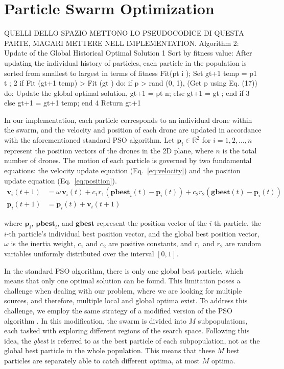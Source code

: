 \section{Particle Swarm Optimization}
QUELLI DELLO SPAZIO METTONO LO PSEUDOCODICE DI QUESTA PARTE,
MAGARI METTERE NELL IMPLEMENTATION.
Algorithm 2: Update of the Global Historical Optimal
Solution
1 Sort by fitness value: After updating the individual history of
particles, each particle in the population is sorted from smallest to
largest in terms of fitness Fit(pt
i
);
Set gt+1
temp = p1
t
;
2 if Fit (gt+1
temp) > Fit (gt
) do:
if p > rand (0, 1), (Get p using Eq. (17)) do:
Update the global optimal solution, gt+1 = pt
n;
else gt+1 = gt
;
end if
3 else gt+1 = gt+1
temp;
end
4 Return gt+1


\par In our implementation, each particle corresponds to an individual drone 
within the swarm, and the velocity and position of each drone are updated in 
accordance with the aforementioned standard PSO algorithm. Let $\mathbf{p}_i \in \mathbb{R}^2$ 
for $i = 1, 2, \dots, n$ represent the position vectors of the drones in the 2D plane, 
where $n$ is the total number of drones. The motion of each particle is governed 
by two fundamental equations: the velocity update equation (Eq.~\ref{eq:velocity}) and 
the position update equation (Eq.~\ref{eq:position}).
\begin{align}
    \mathbf{v}_{i}(t+1) &= \omega \, \mathbf{v}_{i}(t) + c_1 r_1 \left( \mathbf{pbest}_{i}(t) - \mathbf{p}_{i}(t) \right) 
    + c_2 r_2 \left( \mathbf{gbest}(t) - \mathbf{p}_{i}(t) \right) \label{eq:velocity} \\
    \mathbf{p}_{i}(t+1) &= \mathbf{p}_{i}(t) + \mathbf{v}_{i}(t+1) \label{eq:position}
\end{align}
    
where $\mathbf{p}_i$, $\mathbf{pbest}_i$, and $\mathbf{gbest}$ represent the position vector of the $i$-th particle, 
the $i$-th particle's individual best position vector, and the global best position vector, 
$\omega$ is the inertia weight, $c_1$ and $c_2$ are positive constants, and
$r_1$ and $r_2$ are random variables uniformly distributed over the interval $[0, 1]$.

\par In the standard PSO algorithm, there is only one global best particle, 
which means that only one optimal solution can be found. This limitation 
poses a challenge when dealing with our problem, where we are looking for multiple sources, 
and therefore, multiple local and global optima exist. To address this challenge, 
we employ the same strategy of a modified version of the PSO algorithm \cite{PSO_IMPORTANT}. 
In this modification, the swarm is divided into $M$ subpopulations, each tasked with exploring 
different regions of the search space. Following this idea, the \textit{gbest} is referred to as 
the best particle of each subpopulation, not as the global best particle in the whole population. 
This means that these $M$ best particles are separately able to catch different optima, at most $M$ optima.

